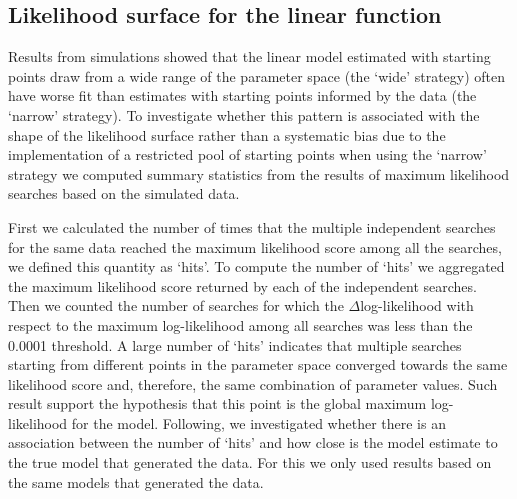 

\subsection{Likelihood surface for the linear function}

Results from simulations showed that the linear model estimated with starting points draw from a wide range of the parameter space (the `wide' strategy) often have worse fit than estimates with starting points informed by the data (the `narrow' strategy). To investigate whether this pattern is associated with the shape of the likelihood surface rather than a systematic bias due to the implementation of a restricted pool of starting points when using the `narrow' strategy we computed summary statistics from the results of maximum likelihood searches based on the simulated data.

First we calculated the number of times that the multiple independent searches for the same data reached the maximum likelihood score among all the searches, we defined this quantity as `hits'. To compute the number of `hits' we aggregated the maximum likelihood score returned by each of the independent searches. Then we counted the number of searches for which the $\Delta$log-likelihood with respect to the maximum log-likelihood among all searches was less than the 0.0001 threshold. A large number of `hits' indicates that multiple searches starting from different points in the parameter space converged towards the same likelihood score and, therefore, the same combination of parameter values. Such result support the hypothesis that this point is the global maximum log-likelihood for the model. Following, we investigated whether there is an association between the number of `hits' and how close is the model estimate to the true model that generated the data. For this we only used results based on the same models that generated the data.

